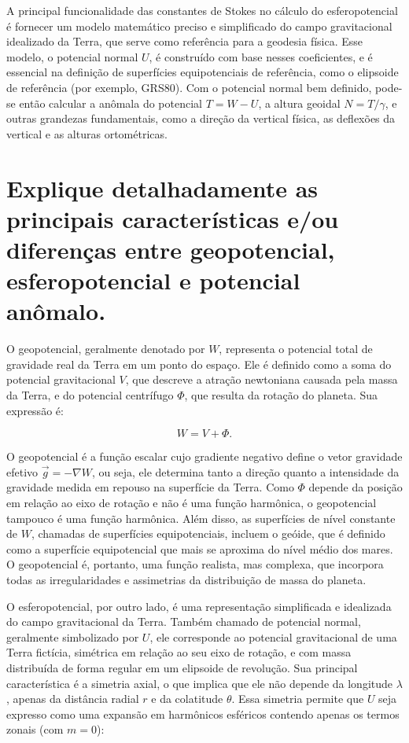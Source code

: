 A principal funcionalidade das constantes de Stokes no cálculo do esferopotencial é fornecer um modelo matemático preciso e simplificado do campo gravitacional idealizado da Terra, que serve como referência para a geodesia física. Esse modelo, o potencial normal \( U \), é construído com base nesses coeficientes, e é essencial na definição de superfícies equipotenciais de referência, como o elipsoide de referência (por exemplo, GRS80). Com o potencial normal bem definido, pode-se então calcular a anômala do potencial \( T = W - U \), a altura geoidal \( N = T/\gamma \), e outras grandezas fundamentais, como a direção da vertical física, as deflexões da vertical e as alturas ortométricas.


\section{Explique detalhadamente as principais características e/ou diferenças entre geopotencial, esferopotencial e potencial anômalo.}

O geopotencial, geralmente denotado por \( W \), representa o potencial total de gravidade real da Terra em um ponto do espaço. Ele é definido como a soma do potencial gravitacional \( V \), que descreve a atração newtoniana causada pela massa da Terra, e do potencial centrífugo \( \Phi \), que resulta da rotação do planeta. Sua expressão é:

\[
W = V + \Phi \text{.}
\]

O geopotencial é a função escalar cujo gradiente negativo define o vetor gravidade efetivo \( \vec{g} = -\nabla W \), ou seja, ele determina tanto a direção quanto a intensidade da gravidade medida em repouso na superfície da Terra. Como \( \Phi \) depende da posição em relação ao eixo de rotação e não é uma função harmônica, o geopotencial tampouco é uma função harmônica. Além disso, as superfícies de nível constante de \( W \), chamadas de superfícies equipotenciais, incluem o geóide, que é definido como a superfície equipotencial que mais se aproxima do nível médio dos mares. O geopotencial é, portanto, uma função realista, mas complexa, que incorpora todas as irregularidades e assimetrias da distribuição de massa do planeta.

O esferopotencial, por outro lado, é uma representação simplificada e idealizada do campo gravitacional da Terra. Também chamado de potencial normal, geralmente simbolizado por \( U \), ele corresponde ao potencial gravitacional de uma Terra fictícia, simétrica em relação ao seu eixo de rotação, e com massa distribuída de forma regular em um elipsoide de revolução. Sua principal característica é a simetria axial, o que implica que ele não depende da longitude \( \lambda \), apenas da distância radial \( r \) e da colatitude \( \theta \). Essa simetria permite que \( U \) seja expresso como uma expansão em harmônicos esféricos contendo apenas os termos zonais (com \( m = 0 \)):

